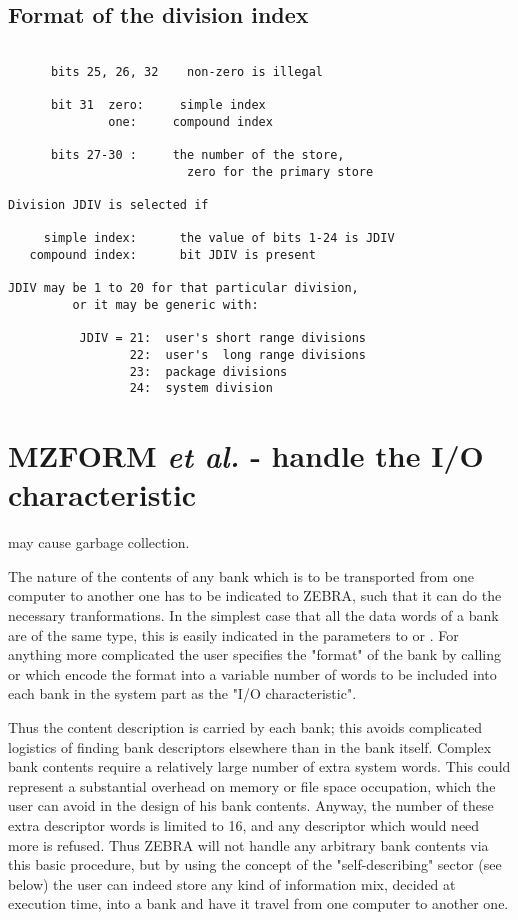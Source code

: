 \subsection*{Format of the division index}

\begin{verbatim}

      bits 25, 26, 32    non-zero is illegal

      bit 31  zero:     simple index
              one:     compound index

      bits 27-30 :     the number of the store,
                         zero for the primary store

Division JDIV is selected if

     simple index:      the value of bits 1-24 is JDIV
   compound index:      bit JDIV is present

JDIV may be 1 to 20 for that particular division,
         or it may be generic with:

          JDIV = 21:  user's short range divisions
                 22:  user's  long range divisions
                 23:  package divisions
                 24:  system division
\end{verbatim} 

\section{MZFORM {\it et al.} - handle the I/O characteristic}

 may cause garbage collection.

The nature of the contents of any bank which is to be transported
from one computer to another one has to be indicated to ZEBRA,
such that it can do the necessary tranformations.
In the simplest case that all the data words of a bank are
of the same type, this is easily indicated in the parameters
to  or .
For anything more complicated the user specifies the "format"
of the bank by calling  or  which encode the format
into a variable number of words to be included into each bank
in the system part as the "I/O characteristic".

Thus the content description is carried by each bank;
this avoids complicated logistics of finding bank descriptors
elsewhere than in the bank itself.
Complex bank contents require a relatively large number
of extra system words.
This could represent a substantial overhead on memory
or file space occupation,
which the user can avoid in the design of his bank contents.
Anyway, the number of these extra descriptor words is limited to 16,
and any descriptor which would need more is refused.
Thus ZEBRA will not handle any arbitrary bank contents
via this basic procedure,
but by using the concept of the "self-describing" sector (see below)
the user can indeed store any kind of information mix,
decided at execution time, into a bank and have it travel
from one computer to another one.

